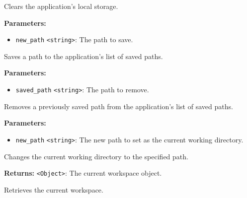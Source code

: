 \documentclass[12pt,a4paper]{article}
\begin{document}
\noindent Clears the application's local storage.

\vspace{5mm}
\noindent {}


\noindent \textbf{Parameters:}
\begin{itemize}
  \item \texttt{new\_path} \texttt{<string>}: The path to save.
\end{itemize}

\noindent Saves a path to the application's list of saved paths.

\vspace{5mm}
\noindent {}


\noindent \textbf{Parameters:}
\begin{itemize}
  \item \texttt{saved\_path} \texttt{<string>}: The path to remove.
\end{itemize}

\noindent Removes a previously saved path from the application's list of saved paths.

\vspace{5mm}
\noindent {}


\noindent \textbf{Parameters:}
\begin{itemize}
  \item \texttt{new\_path} \texttt{<string>}: The new path to set as the current working directory.
\end{itemize}

\noindent Changes the current working directory to the specified path.

\vspace{5mm}
\noindent {}


\noindent \textbf{Returns:} \texttt{<Object>}: The current workspace object.

\noindent Retrieves the current workspace.
\end{document}
